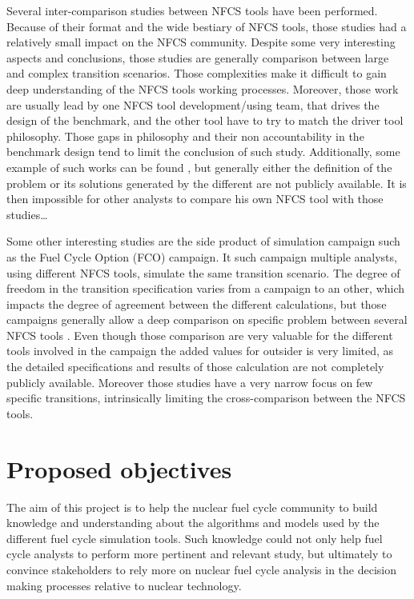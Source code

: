 Several inter-comparison studies between NFCS tools have been performed. Because
of their format and the wide bestiary of NFCS tools, those studies had a
relatively small impact on the NFCS community. Despite some very interesting
aspects and conclusions, those studies are generally comparison between large
and complex transition scenarios. Those complexities make it difficult to gain
deep understanding of the NFCS tools working processes. Moreover, those work are
usually lead by one NFCS tool development/using team, that drives the design of
the benchmark, and the other tool have to try to match the driver tool
philosophy. Those gaps in philosophy and their non accountability in the
benchmark design tend to limit the conclusion of such study. Additionally, some
example of such works can be found \cite{IAEA - Benchmark Study on Nuclear Fuel Cycle
Transition Scenarios} \cite{MIT - Guerin}, but generally either the definition
of the problem or its solutions generated by the different are not publicly
available. It is then impossible for other analysts to compare his own NFCS tool with
those studies\ldots

Some other interesting studies are the side product of simulation campaign such
as the Fuel Cycle Option (FCO) campaign. It such campaign multiple analysts,
using different NFCS tools, simulate the same transition scenario. The degree of
freedom in the transition specification varies from a campaign to an other,
which impacts the degree of agreement between the different calculations, but
those campaigns generally allow a deep comparison on specific problem between
several NFCS tools \cite{Standardized verification of fuel cycle modeling -
B.Feng}.  Even though those comparison are very valuable for the different tools
involved in the campaign the added values for outsider is very limited, as the
detailed specifications and results of those calculation are not completely
publicly available. Moreover those studies have a very narrow focus on few
specific transitions, intrinsically limiting the cross-comparison between the
NFCS tools. 


\section{Proposed objectives}

The aim of this project is to help the nuclear fuel cycle community to build
knowledge and understanding about the algorithms and models used by the
different fuel cycle simulation tools. Such knowledge could not only help fuel
cycle analysts to perform more pertinent and relevant study, but ultimately to
convince stakeholders to rely more on nuclear fuel cycle analysis in the
decision making processes relative to nuclear technology.


